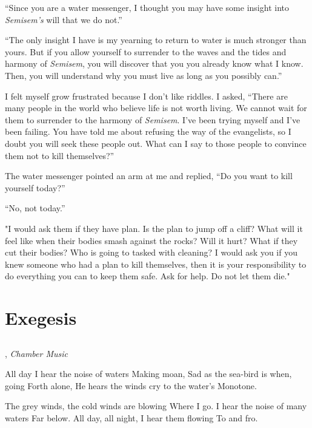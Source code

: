 \documentclass[12pt, letterpaper]{report}
\begin{document}
\vspace{1\baselineskip}
``Since you are a water messenger, I thought you may have some insight into \textit{Semisem's} will that we do not.''

\vspace{1\baselineskip}
``The only insight I have is my yearning to return to water is much stronger than yours. But if you allow yourself to surrender to the waves and the tides and harmony of \textit{Semisem}, you will discover that you you already know what I know. Then, you will understand why you must live as long as you possibly can.''

\vspace{1\baselineskip}
I felt myself grow frustrated because I don't like riddles. I asked, ``There are many people in the world who believe life is not worth living. We cannot wait for them to surrender to the harmony of \textit{Semisem}. I've been trying myself and I've been failing. You have told me about refusing the way of the evangelists, so I doubt you will seek these people out. What can I say to those people to convince them not to kill themselves?''

\vspace{1\baselineskip}
The water messenger pointed an arm at me and replied, ``Do you want to kill yourself today?''

\vspace{1\baselineskip}
``No, not today.''

\vspace{1\baselineskip}
"I would ask them if they have plan. Is the plan to jump off a cliff? What will it feel like when their bodies smash against the rocks? Will it hurt? What if they cut their bodies? Who is going to tasked with cleaning? I would ask you if you knew someone who had a plan to kill themselves, then it is your responsibility to do everything you can to keep them safe. Ask for help. Do not let them die."

\part{Exegesis}

\chapter{}


\author{James Joyce}, \textit{Chamber Music}

\begin{poem}
\begin{stanza}
All day I hear the noise of waters\verseline
Making moan,\verseline
Sad as the sea-bird is when, going\verseline
Forth alone,\verseline
He hears the winds cry to the water’s\verseline
Monotone.
\end{stanza}
\begin{stanza}
The grey winds, the cold winds are blowing\verseline
Where I go.\verseline
I hear the noise of many waters\verseline
Far below.\verseline
All day, all night, I hear them flowing\verseline
To and fro.
\end{stanza}
\end{poem}
\end{document}
